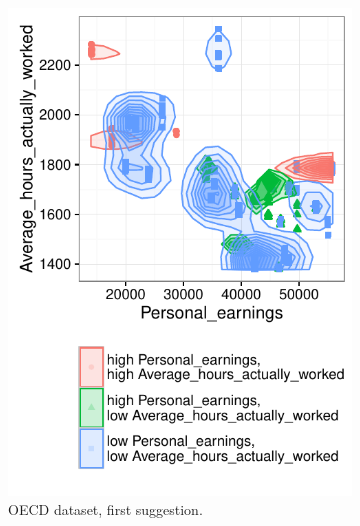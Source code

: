 \begin{figure}
    \centering
    \begin{subfigure}[b]{0.3\textwidth}
        \includegraphics[width=\textwidth]{Experiments/CaseValidation1}
        \caption{OECD dataset, first suggestion.}
        \label{fig:validation1}
    \end{subfigure}
    ~
    \begin{subfigure}[b]{0.3\textwidth}

\end{subfigure}
\end{figure}
